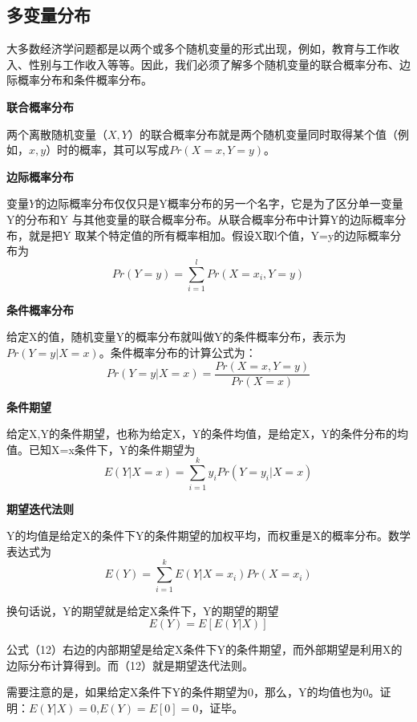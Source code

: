 \documentclass[cn,12pt,math=newtx,citestyle=gb7714-2015,bibstyle=gb7714-2015]{elegantbook}
\begin{document}
	\subsection{多变量分布}
	大多数经济学问题都是以两个或多个随机变量的形式出现，例如，教育与工作收入、性别与工作收入等等。因此，我们必须了解多个随机变量的联合概率分布、边际概率分布和条件概率分布。
	
	\textbf{联合概率分布}
	
	两个离散随机变量（$X,Y$）的联合概率分布就是两个随机变量同时取得某个值（例如，$x,y$）时的概率，其可以写成$Pr(X=x,Y=y)$。
	
	\textbf{边际概率分布}
	
	变量$Y$的边际概率分布仅仅只是Y概率分布的另一个名字，它是为了区分单一变量Y的分布和Y 与其他变量的联合概率分布。从联合概率分布中计算Y的边际概率分布，就是把Y 取某个特定值的所有概率相加。假设X取l个值，Y=y的边际概率分布为
	\begin{equation}
		Pr(Y=y)=\sum_{i=1}^{l}{Pr(X=x_i,Y=y)}
	\end{equation}
	
	\textbf{条件概率分布}
	
	给定X的值，随机变量Y的概率分布就叫做Y的条件概率分布，表示为$Pr(Y=y|X=x)$。条件概率分布的计算公式为：
	\begin{equation}
		Pr(Y=y|X=x)=\frac{Pr(X=x,Y=y)}{Pr(X=x)}
	\end{equation}
	
	\textbf{条件期望}
	
	给定X,Y的条件期望，也称为给定X，Y的条件均值，是给定X，Y的条件分布的均值。已知X=x条件下，Y的条件期望为
	\begin{equation}
		E(Y|X=x)=\sum_{i=1}^{k}{y_iPr(Y=y_i|X=x)}
	\end{equation}
	
	\textbf{期望迭代法则}
	
	Y的均值是给定X的条件下Y的条件期望的加权平均，而权重是X的概率分布。数学表达式为
	\begin{equation}
		E(Y)=\sum_{i=1}^{k}{E(Y|X=x_i)Pr(X=x_i)}
	\end{equation}
	
	换句话说，Y的期望就是给定X条件下，Y的期望的期望
	\begin{equation}
		E(Y)=E[E(Y|X)]
	\end{equation}
	
	公式（12）右边的内部期望是给定X条件下Y的条件期望，而外部期望是利用X的边际分布计算得到。而（12）就是期望迭代法则。
	
	需要注意的是，如果给定X条件下Y的条件期望为0，那么，Y的均值也为0。证明：$E(Y|X)=0$,$E(Y)=E[0]=0$，证毕。
	
\end{document}
